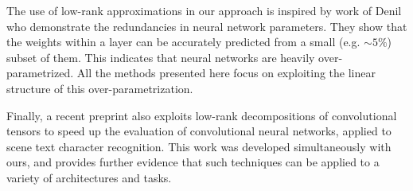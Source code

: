 The use of low-rank approximations in our approach is inspired by work
of Denil \etal \cite{denil2013predicting} who demonstrate the redundancies in neural
network parameters. They show that the weights within a layer can be
accurately predicted from a small (e.g. $\sim 5\%$) subset of them. This
indicates that neural networks are heavily over-parametrized.  All the
methods presented here focus on exploiting the linear structure of this
over-parametrization.

Finally, a recent preprint \cite{zisserman14} also exploits low-rank decompositions
of convolutional tensors to speed up the evaluation of convolutional neural networks, applied to scene text character
recognition. This work was developed simultaneously with ours, and provides 
further evidence that such techniques can be applied to a variety of architectures 
and tasks.


